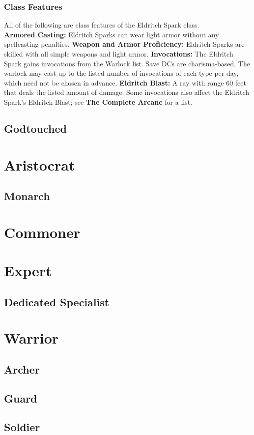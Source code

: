 \documentclass[11pt]{report}
\begin{document}
\subsubsection{Class Features}
All of the following are class features of the Eldritch Spark class. \\
\textbf{Armored Casting:} Eldritch Sparks can wear light armor without any
spellcasting penalties.
\textbf{Weapon and Armor Proficiency:} Eldritch Sparks are skilled with all
simple weapons and light armor.
\textbf{Invocations:} The Eldritch Spark gains invocations from the Warlock
list. Save DCs are charisma-based. The warlock may cast up to the listed number
of invocations of each type per day, which need not be chosen in advance.
\textbf{Eldritch Blast:} A ray with range 60 feet that deals the listed amount
of damage. Some invocations also affect the Eldritch Spark's Eldritch Blast; see
\textbf{The Complete Arcane} for a list.

\subsection{Godtouched}

\section{Aristocrat}
\subsection{Monarch}

\section{Commoner}

\section{Expert}
\subsection{Dedicated Specialist}

\section{Warrior}
\subsection{Archer}
\subsection{Guard}
\subsection{Soldier}
\end{document}
